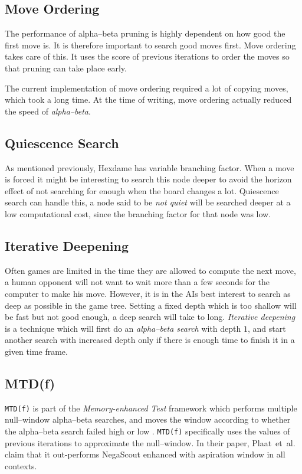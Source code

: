 \documentclass[a4paper,10pt]{article}
\begin{document}
\subsection*{Move Ordering}
The performance of alpha--beta pruning is highly dependent on how good the first move is. It is therefore important to search good moves first. Move ordering takes care of this. It uses the score of previous iterations to order the moves so that pruning can take place early.

The current implementation of move ordering required a lot of copying moves, which took a long time. At the time of writing, move ordering actually reduced the speed of \emph{alpha--beta}.

\subsection*{Quiescence Search}
As mentioned previously, Hexdame has variable branching factor. When a move is forced it might be interesting to search this node deeper to avoid the horizon effect of not searching for enough when the board changes a lot. Quiescence search can handle this, a node said to be \emph{not quiet} will be searched deeper at a low computational cost, since the branching factor for that node was low.

\subsection*{Iterative Deepening}
Often games are limited in the time they are allowed to compute the next move, a human opponent will not want to wait more than a few seconds for the computer to make his move. However, it is in the AIs best interest to search as deep as possible in the game tree. Setting a fixed depth which is too shallow will be fast but not good enough, a deep search will take to long. \emph{Iterative deepening} is a technique which will first do an \emph{alpha--beta search} with depth $1$, and start another search with increased depth only if there is enough time to finish it in a given time frame.

\subsection*{MTD(f)}
\texttt{MTD(f)} is part of the \emph{Memory-enhanced Test} framework which performs multiple null--window alpha--beta searches, and moves the window according to whether the alpha--beta search failed high or low \cite{Plaat1996}. \texttt{MTD(f)} specifically uses the values of previous iterations to approximate the null--window. In their paper, Plaat~et~al.~\cite{Plaat1996} claim that it out-performs NegaScout enhanced with aspiration window in all contexts.
\end{document}
